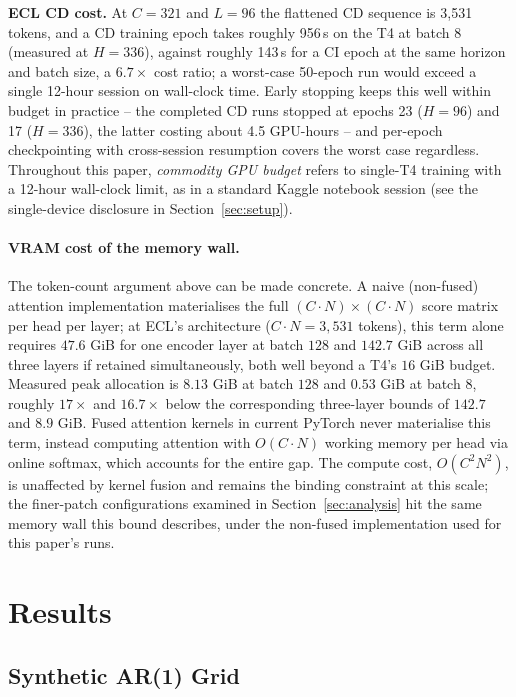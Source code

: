 \documentclass[10pt]{article} %
\begin{document}
    \textbf{ECL CD cost.} At $C = 321$ and $L = 96$ the flattened CD sequence is 3{,}531 tokens, and a CD training epoch
    takes roughly 956\,s on the T4 at batch 8 (measured at $H = 336$), against roughly 143\,s for a CI epoch at the same
    horizon and batch size, a $6.7\times$ cost ratio; a worst-case 50-epoch run would exceed a single 12-hour session on
    wall-clock time. Early stopping keeps this well within budget in practice -- the completed CD runs stopped at epochs
    23 ($H = 96$) and 17 ($H = 336$), the latter costing about 4.5 GPU-hours -- and per-epoch checkpointing with
    cross-session resumption covers the worst case regardless. Throughout this paper, \emph{commodity GPU budget} refers
    to single-T4 training with a 12-hour wall-clock limit, as in a standard Kaggle notebook session (see the
    single-device disclosure in Section~\ref{sec:setup}).

    \paragraph{VRAM cost of the memory wall.} The token-count argument above can be made concrete. A naive (non-fused)
    attention implementation materialises the full $(C \cdot N) \times (C \cdot N)$ score matrix per head per layer; at
    ECL's architecture ($C \cdot N = 3{,}531$ tokens), this term alone requires $47.6$ GiB for one encoder layer at batch
    $128$ and $142.7$ GiB across all three layers if retained simultaneously, both well beyond a T4's $16$ GiB budget.
    Measured peak allocation is $8.13$ GiB at batch $128$ and $0.53$ GiB at batch $8$, roughly $17\times$ and $16.7\times$
    below the corresponding three-layer bounds of $142.7$ and $8.9$ GiB. Fused attention kernels in current PyTorch never
    materialise this term, instead computing attention with $O(C \cdot N)$ working memory per head via online softmax,
    which accounts for the entire gap. The compute cost, $O(C^2 N^2)$, is unaffected by kernel fusion and remains the
    binding constraint at this scale; the finer-patch configurations examined in Section~\ref{sec:analysis} hit the same
    memory wall this bound describes, under the non-fused implementation used for this paper's runs.


    \section{Results}
    \label{sec:results}

    \subsection{Synthetic AR(1) Grid}
\end{document}
